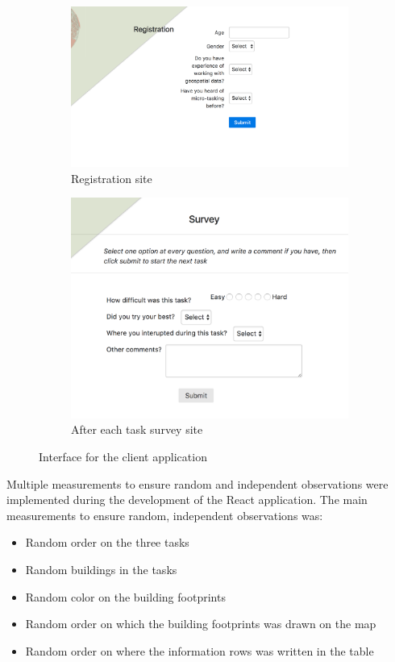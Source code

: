\begin{figure}[H]
	\centering
	\begin{subfigure}[b]{0.50\textwidth}
		\centering
		\includegraphics[width=\linewidth]{fig/mt-registration}
		\caption{Registration site}
		\label{fig:mt-registration}
	\end{subfigure}
	\begin{subfigure}[b]{0.46\textwidth}
		\centering
		\includegraphics[width=\linewidth]{fig/mt-survey}
		\caption{After each task survey site}
		\label{fig:mt-survey}
	\end{subfigure}
	\caption{Interface for the client application}
	\label{fig:client-interface}
\end{figure}
       
Multiple measurements to ensure random and independent observations were implemented during the development of the React application. The main measurements to ensure random, independent observations was:
\begin{itemize}
	\item Random order on the three tasks
	\item Random buildings in the tasks
	\item Random color on the building footprints
	\item Random order on which the building footprints was drawn on the map
	\item Random order on where the information rows was written in the table
\end{itemize}

